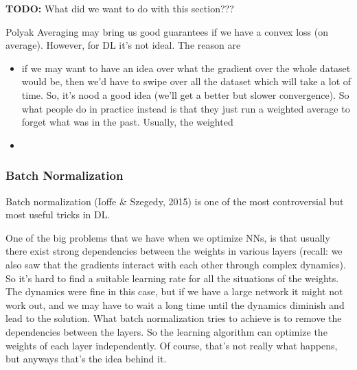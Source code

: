\documentclass[a2paper,8pt]{extarticle}
\newcommand{\todo}[1]{\textbf{TODO:} #1}
\newcommand{\todo}[1]{%
}
\begin{document}
\begin{landscape}
\begin{multicols*}{7}
\todo{What did we want to do with this section???}

Polyak Averaging may bring us good guarantees if we have a convex loss (on
average). However, for DL it's not ideal. The reason are
\begin{itemize}
  \item if we may want to have an idea over what the gradient over the whole
  dataset would be, then we'd have to swipe over all the dataset which will take
  a lot of time. So, it's nood a good idea (we'll get a better but slower
  convergence). So what people do in practice instead is that they just run a
  weighted average to forget what was in the past. Usually, the weighted  
  \item 
\end{itemize} 

\subsubsection{Batch Normalization}

Batch normalization (Ioffe \& Szegedy, 2015) is one of the most controversial
but most useful tricks in DL. 

One of the big problems that we have when we optimize NNs, is that usually there
exist strong dependencies between the weights in various layers (recall: we also
saw that the gradients interact with each other through complex dynamics). So
it's hard to find a suitable learning rate for all the situations of the
weights. The dynamics were fine in this case, but if we have a large network it
might not work out, and we may have to wait a long time until the dynamics
diminish and lead to the solution. What batch normalization tries to achieve is
to remove the dependencies between the layers. So the learning algorithm can
optimize the weights of each layer independently. Of course, that's not really
what happens, but anyways that's the idea behind it.



\end{multicols*}
\end{landscape}
\end{document}
